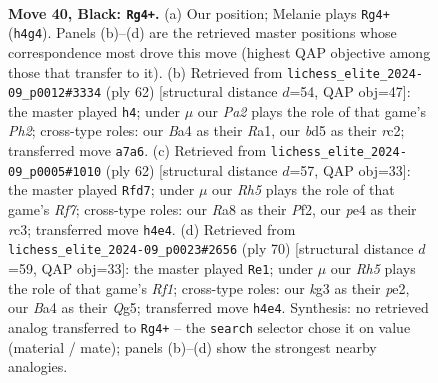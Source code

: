 \documentclass[11pt]{article}
\begin{document}
\clearpage

\begin{figure}[p]\centering
\begin{subfigure}{0.46\textwidth}\centering
\resizebox{\linewidth}{!}{%
\newchessgame
\chessboard[
  setfen={r7/pp3p2/6k1/3B3p/bP2P2r/P5Kp/8/R4R2 b - - 7 40},
  showmover=false,
  pgfstyle=straightmove, color=movearrow, markmove={h4-g4}
]}
\caption{}
\end{subfigure}\hfill
\begin{subfigure}{0.46\textwidth}\centering
\resizebox{\linewidth}{!}{%
\newchessgame
\chessboard[
  setfen={8/1p3R2/6k1/p5Np/1b6/1P4P1/1rr2PKP/R7 w - - 1 32},
  showmover=false,
  pgfstyle=straightmove, color=movearrow, markmove={h2-h4}
]}
\caption{}
\end{subfigure}
\\[4pt]
\begin{subfigure}{0.46\textwidth}\centering
\resizebox{\linewidth}{!}{%
\newchessgame
\chessboard[
  setfen={6k1/R4R2/4p1p1/2P4p/2rb4/2r1B1P1/5P1P/6K1 w - - 1 32},
  showmover=false,
  pgfstyle=straightmove, color=movearrow, markmove={f7-d7}
]}
\caption{}
\end{subfigure}\hfill
\begin{subfigure}{0.46\textwidth}\centering
\resizebox{\linewidth}{!}{%
\newchessgame
\chessboard[
  setfen={4r1k1/pp6/4r1P1/5bQ1/8/2P5/PPP1p3/1K3R2 w - - 1 36},
  showmover=false,
  pgfstyle=straightmove, color=movearrow, markmove={f1-e1}
]}
\caption{}
\end{subfigure}
\caption{\textbf{Move 40, Black: \texttt{Rg4+}.} (a) Our position; Melanie plays \texttt{Rg4+} (\texttt{h4g4}). Panels (b)--(d) are the retrieved master positions whose correspondence most drove this move (highest QAP objective among those that transfer to it). (b) Retrieved from \texttt{lichess\_elite\_2024-09\_p0012\#3334} (ply 62) [structural distance $d$=54, QAP obj=47]: the master played \texttt{h4}; under $\mu$ our \emph{Pa2} plays the role of that game's \emph{Ph2}; cross-type roles: our \emph{B}a4 as their \emph{R}a1, our \emph{b}d5 as their \emph{r}c2; transferred move \texttt{a7a6}. (c) Retrieved from \texttt{lichess\_elite\_2024-09\_p0005\#1010} (ply 62) [structural distance $d$=57, QAP obj=33]: the master played \texttt{Rfd7}; under $\mu$ our \emph{Rh5} plays the role of that game's \emph{Rf7}; cross-type roles: our \emph{R}a8 as their \emph{P}f2, our \emph{p}e4 as their \emph{r}c3; transferred move \texttt{h4e4}. (d) Retrieved from \texttt{lichess\_elite\_2024-09\_p0023\#2656} (ply 70) [structural distance $d$=59, QAP obj=33]: the master played \texttt{Re1}; under $\mu$ our \emph{Rh5} plays the role of that game's \emph{Rf1}; cross-type roles: our \emph{k}g3 as their \emph{p}e2, our \emph{B}a4 as their \emph{Q}g5; transferred move \texttt{h4e4}. Synthesis: no retrieved analog transferred to \texttt{Rg4+} -- the \texttt{search} selector chose it on value (material / mate); panels (b)--(d) show the strongest nearby analogies.}
\label{fig:thought-m79}
\end{figure}
\end{document}
